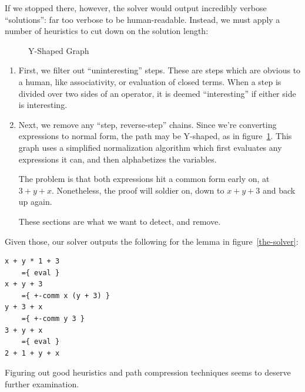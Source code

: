 \documentclass[draft, twocolumn]{article}
\theoremstyle{definition}
\theoremstyle{definition}
\begin{document}
If we stopped there, however, the solver would output incredibly verbose
``solutions'': far too verbose to be human-readable. Instead, we must apply a
number of heuristics to cut down on the solution length:
\begin{figure}
  \centering
  \caption{Y-Shaped Graph}
  \label{y-graph}
\end{figure}
\begin{enumerate}
  \item First, we filter out ``uninteresting'' steps. These are steps which are
    obvious to a human, like associativity, or evaluation of closed terms. When
    a step is divided over two sides of an operator, it is deemed
    ``interesting'' if either side is interesting.
  \item Next, we remove any ``step, reverse-step'' chains. Since we're
    converting expressions to normal form, the path may be Y-shaped, as in
    figure~\ref{y-graph}. This graph uses a simplified normalization algorithm
    which first evaluates any expressions it can, and then alphabetizes the
    variables.

    The problem is that both expressions hit a common form early on, at \(3 + y
    + x\). Nonetheless, the proof will soldier on, down to \(x + y + 3\) and
    back up again.

    These sections are what we want to detect, and remove.
\end{enumerate}

Given those, our solver outputs the following for the lemma in
figure~\ref{the-solver}:
\begin{verbatim}
x + y * 1 + 3
    ={ eval }
x + y + 3
    ={ +-comm x (y + 3) }
y + 3 + x
    ={ +-comm y 3 }
3 + y + x
    ={ eval }
2 + 1 + y + x
\end{verbatim}
Figuring out good heuristics and path compression techniques seems to deserve
further examination.
\end{document}
